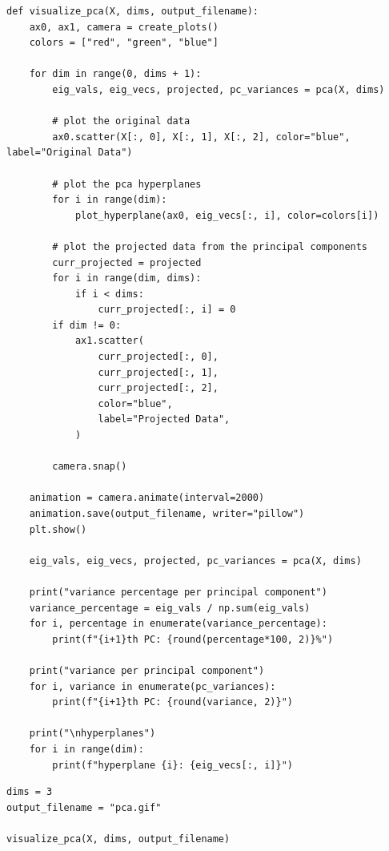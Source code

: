 \documentclass[openany]{book}
\begin{document}
\begin{tcolorbox}
\tiny
\begin{verbatim}
def visualize_pca(X, dims, output_filename):
    ax0, ax1, camera = create_plots()
    colors = ["red", "green", "blue"]

    for dim in range(0, dims + 1):
        eig_vals, eig_vecs, projected, pc_variances = pca(X, dims)

        # plot the original data
        ax0.scatter(X[:, 0], X[:, 1], X[:, 2], color="blue", label="Original Data")

        # plot the pca hyperplanes
        for i in range(dim):
            plot_hyperplane(ax0, eig_vecs[:, i], color=colors[i])

        # plot the projected data from the principal components
        curr_projected = projected
        for i in range(dim, dims):
            if i < dims:
                curr_projected[:, i] = 0
        if dim != 0:
            ax1.scatter(
                curr_projected[:, 0],
                curr_projected[:, 1],
                curr_projected[:, 2],
                color="blue",
                label="Projected Data",
            )

        camera.snap()

    animation = camera.animate(interval=2000)
    animation.save(output_filename, writer="pillow")
    plt.show()

    eig_vals, eig_vecs, projected, pc_variances = pca(X, dims)

    print("variance percentage per principal component")
    variance_percentage = eig_vals / np.sum(eig_vals)
    for i, percentage in enumerate(variance_percentage):
        print(f"{i+1}th PC: {round(percentage*100, 2)}%")

    print("variance per principal component")
    for i, variance in enumerate(pc_variances):
        print(f"{i+1}th PC: {round(variance, 2)}")

    print("\nhyperplanes")
    for i in range(dim):
        print(f"hyperplane {i}: {eig_vecs[:, i]}")
\end{verbatim}
\end{tcolorbox}

\begin{tcolorbox}
\tiny
\begin{verbatim}
dims = 3
output_filename = "pca.gif"

visualize_pca(X, dims, output_filename)
\end{verbatim}
\end{tcolorbox}
\end{document}
